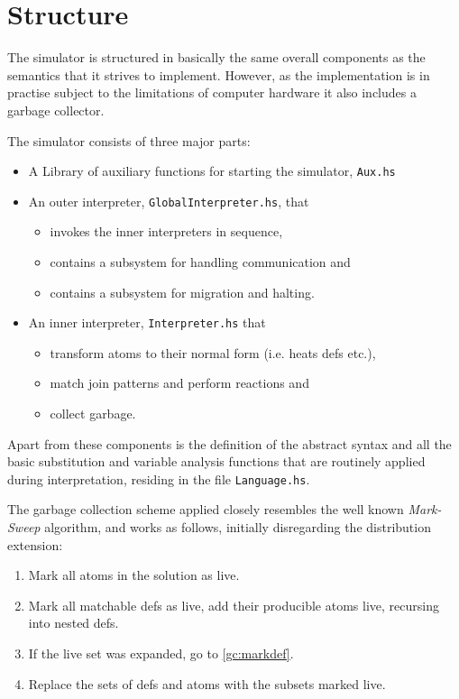 \section{Structure}

The simulator is structured in basically the same overall components as the
semantics that it strives to implement. However, as the implementation is in
practise subject to the limitations of computer hardware it also includes a
garbage collector.

The simulator consists of three major parts:
\begin{itemize}
\item A Library of auxiliary functions for starting the simulator,
      \texttt{Aux.hs}
\item An outer interpreter, \texttt{GlobalInterpreter.hs}, that
      \begin{itemize}
      \item invokes the inner interpreters in sequence,
      \item contains a subsystem for handling communication and
      \item contains a subsystem for migration and halting.
      \end{itemize}
\item An inner interpreter, \texttt{Interpreter.hs} that
      \begin{itemize}
      \item transform atoms to their normal form (i.e. heats defs etc.),
      \item match join patterns and perform reactions and
      \item collect garbage.
      \end{itemize}
\end{itemize}

Apart from these components is the definition of the abstract syntax and all the
basic substitution and variable analysis functions that are routinely applied
during interpretation, residing in the file \texttt{Language.hs}.

The garbage collection scheme applied closely resembles the well known
\emph{Mark-Sweep} algorithm, and works as follows, initially disregarding the
distribution extension:
\begin{enumerate}
\item Mark all atoms in the solution as live.
\item Mark all matchable defs as live, add their producible atoms live,
recursing into nested defs.\label{gc:markdef}
\item If the live set was expanded, go to \ref{gc:markdef}.
\item Replace the sets of defs and atoms with the subsets marked live.
\end{enumerate}

